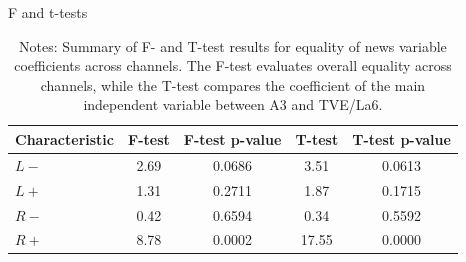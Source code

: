 \documentclass[12pt]{article}
\begin{document}
	
	
	
	\begin{table}[H]
		\centering
	
		\label{tab:tests}
		\caption{F and t-tests }
		\begin{tabular}{lcccc}
			\hline
			Characteristic & F-test  & F-test p-value & T-test  & T-test p-value \\
			\hline
			$ {L-}$& 2.69 & 0.0686 & 3.51  & 0.0613 \\
			$ {L+}$ & 1.31 & 0.2711 & 1.87  & 0.1715 \\
			$ {R-}$ & 0.42 & 0.6594 & 0.34 & 0.5592 \\
$ {R+}$ & 8.78 & 0.0002 & 17.55  & 0.0000 \\
			\hline
		\end{tabular}
			\caption*{\small Notes: Summary of F- and T-test results for equality of news variable coefficients across channels. The F-test evaluates overall equality across channels, while the T-test compares the coefficient of the main independent variable between A3 and TVE/La6.}
	\end{table}
	
	
	
\end{document}
